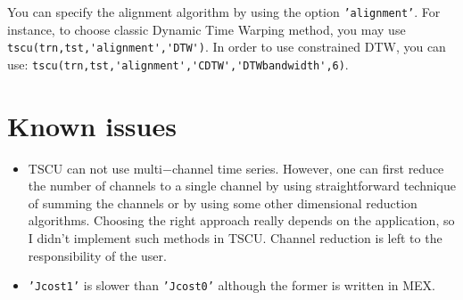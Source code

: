 \documentclass{article}
\newcommand{\parametre}[1]{\texttt{#1}}
\begin{document}
You can specify the alignment algorithm by using the option \parametre{'alignment'}. For instance, to choose classic Dynamic Time Warping method, you may use
\verb|tscu(trn,tst,'alignment','DTW')|.
In order to use constrained DTW, you can use:
\verb|tscu(trn,tst,'alignment','CDTW','DTWbandwidth',6)|.

\section{Known issues}
\begin{itemize}
\item%
TSCU can not use multi$-$channel time series. 
However, one can first reduce the number of channels to a single channel by using straightforward technique of summing the channels or by using some other dimensional reduction algorithms. 
Choosing the right approach really depends on the application, so I didn't implement such methods in TSCU.\@ 
Channel reduction is left to the responsibility of the user.
\item%
\parametre{'Jcost1'} is slower than \parametre{'Jcost0'} although the former is written in MEX.\@
\end{itemize}


\end{document}
